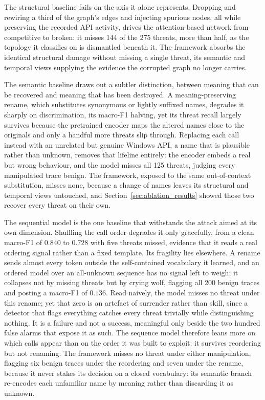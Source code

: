 \documentclass[%
    BCOR=10mm,
    DIV=13,
    toc=bibliography,
    toc=listof,
    oneside,
    12pt,
]{scrbook}
\begin{document}
The structural baseline fails on the axis it alone represents. Dropping and
rewiring a third of the graph's edges and injecting spurious nodes, all while
preserving the recorded API activity, drives the attention-based network from
competitive to broken: it misses 144 of the 275 threats, more than half, as the
topology it classifies on is dismantled beneath it. The framework absorbs the
identical structural damage without missing a single threat, its semantic and
temporal views supplying the evidence the corrupted graph no longer carries.

The semantic baseline draws out a subtler distinction, between meaning that can be
recovered and meaning that has been destroyed. A meaning-preserving rename, which
substitutes synonymous or lightly suffixed names, degrades it sharply on
discrimination, its macro-F1 halving, yet its threat recall largely survives
because the pretrained encoder maps the altered names close to the originals and
only a handful more threats slip through. Replacing each call instead with an
unrelated but genuine Windows API, a name that is plausible rather than unknown,
removes that lifeline entirely: the encoder embeds a real but wrong behaviour, and
the model misses all 125 threats, judging every manipulated trace benign. The
framework, exposed to the same out-of-context substitution, misses none,
because a change of names leaves its structural and temporal views untouched,
and Section~\ref{sec:ablation_results} showed those two recover every threat
on their own.

The sequential model is the one baseline that withstands the attack aimed at its own
dimension. Shuffling the call order degrades it only gracefully, from a clean
macro-F1 of $0.840$ to $0.728$ with five threats missed, evidence that it reads a
real ordering signal rather than a fixed template. Its fragility lies elsewhere. A
rename sends almost every token outside the self-contained vocabulary it learned,
and an ordered model over an all-unknown sequence has no signal left to weigh; it
collapses not by missing threats but by crying wolf, flagging all 200 benign traces
and posting a macro-F1 of $0.136$. Read naively, the model misses no threat under
this rename; yet that zero is an artefact of surrender rather than skill, since a
detector that flags everything catches every threat trivially while distinguishing
nothing. It is a failure and not a success, meaningful only beside the two hundred
false alarms that expose it as such. The sequence model therefore leans more on
which calls appear than on the order it was built to exploit: it survives reordering
but not renaming. The framework misses no threat under either manipulation, flagging
six benign traces under the reordering and seven under the rename, because it never
stakes its decision on a closed vocabulary: its semantic branch re-encodes each
unfamiliar name by meaning rather than discarding it as unknown.
\end{document}
